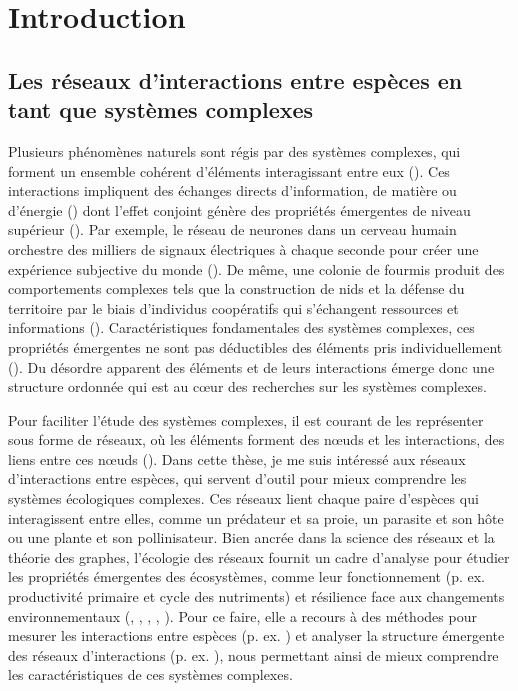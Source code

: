 
\francais   
\doublespacing

\chapter{Introduction}


\section{Les réseaux d'interactions entre espèces en tant que systèmes complexes}

Plusieurs phénomènes naturels sont régis par des systèmes complexes, qui forment
un ensemble cohérent d'éléments interagissant entre eux
(\cite{Rind1999Complexity}). Ces interactions impliquent des échanges directs
d'information, de matière ou d'énergie (\cite{Ladyman2013What}) dont l'effet
conjoint génère des propriétés émergentes de niveau supérieur
(\cite{Foote2007Mathematics}). Par exemple, le réseau de neurones dans un
cerveau humain orchestre des milliers de signaux électriques à chaque seconde
pour créer une expérience subjective du monde (\cite{Sporns2011Human}). De même,
une colonie de fourmis produit des comportements complexes tels que la
construction de nids et la défense du territoire par le biais d'individus
coopératifs qui s'échangent ressources et informations
(\cite{Bonabeau1999Swarm}). Caractéristiques fondamentales des systèmes
complexes, ces propriétés émergentes ne sont pas déductibles des éléments pris
individuellement (\cite{Nielsen2000Emergent}). Du désordre apparent des éléments
et de leurs interactions émerge donc une structure ordonnée qui est au cœur des
recherches sur les systèmes complexes. 

Pour faciliter l'étude des systèmes complexes, il est courant de les représenter
sous forme de réseaux, où les éléments forment des nœuds et les interactions,
des liens entre ces nœuds (\cite{Newman2003Structure}). Dans cette thèse, je me
suis intéressé aux réseaux d'interactions entre espèces, qui servent d'outil
pour mieux comprendre les systèmes écologiques complexes. Ces réseaux lient
chaque paire d'espèces qui interagissent entre elles, comme un prédateur et sa
proie, un parasite et son hôte ou une plante et son pollinisateur. Bien ancrée
dans la science des réseaux et la théorie des graphes, l'écologie des réseaux
fournit un cadre d'analyse pour étudier les propriétés émergentes des
écosystèmes, comme leur fonctionnement (p. ex. productivité primaire et cycle
des nutriments) et résilience face aux changements environnementaux
(\cite{Proulx2005Network}, \cite{McCann2007Protecting}, \cite{McCann2011Food},
\cite{Rooney2012Integrating}, \cite{Valiente-Banuet2019Species}). Pour ce faire,
elle a recours à des méthodes pour mesurer les interactions entre espèces (p.
ex. \cite{Jordano2016Sampling}) et analyser la structure émergente des réseaux
d'interactions (p. ex. \cite{Delmas2019Analysing}), nous permettant ainsi de
mieux comprendre les caractéristiques de ces systèmes complexes. 

